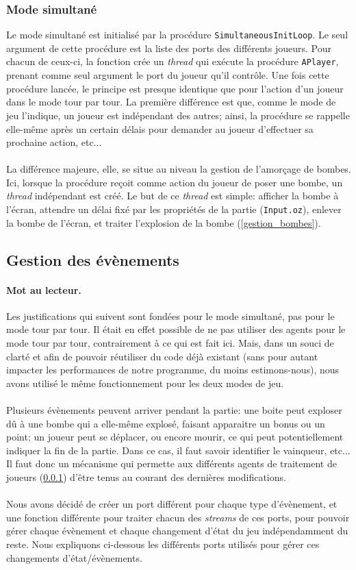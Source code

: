 \documentclass{article}
\begin{document}
\subsubsection{Mode simultané}
\label{simult}
Le mode simultané est initialisé par la procédure \texttt{SimultaneousInitLoop}. Le seul argument de cette procédure est la liste des ports des différents joueurs. Pour chacun de ceux-ci, la fonction crée un \emph{thread} qui exécute la procédure \texttt{APlayer}, prenant comme seul argument le port du joueur qu'il contrôle. Une fois cette procédure lancée, le principe est presque identique que pour l'action d'un joueur dans le mode tour par tour. La première différence est que, comme le mode de jeu l'indique, un joueur est indépendant des autres; ainsi, la procédure se rappelle elle-même après un certain délais pour demander au joueur d'effectuer sa prochaine action, etc... \\ \\
La différence majeure, elle, se situe au niveau la gestion de l'amorçage de bombes. Ici, lorsque la procédure reçoit comme action du joueur de poser une bombe, un \emph{thread} indépendant est créé. Le but de ce \emph{thread} est simple: afficher la bombe à l'écran, attendre un délai fixé par les propriétés de la partie (\texttt{Input.oz}), enlever la bombe de l'écran, et traiter l'explosion de la bombe (\ref{gestion_bombes}).

\subsection{Gestion des évènements}
\paragraph{Mot au lecteur.}Les justifications qui suivent sont fondées pour le mode simultané, pas pour le mode tour par tour. Il était en effet possible de ne pas utiliser des agents pour le mode tour par tour, contrairement à ce qui est fait ici. Mais, dans un souci de clarté et afin de pouvoir réutiliser du code déjà existant (sans pour autant impacter les performances de notre programme, du moins estimons-nous), nous avons utilisé le même fonctionnement pour les deux modes de jeu. \\ \\
Plusieurs évènements peuvent arriver pendant la partie: une boite peut exploser dû à une bombe qui a elle-même explosé, faisant apparaitre un bonus ou un point; un joueur peut se déplacer, ou encore mourir, ce qui peut potentiellement indiquer la fin de la partie. Dans ce cas, il faut savoir identifier le vainqueur, etc... Il faut donc un mécanisme qui permette aux différents agents de traitement de joueurs (\ref{simult}) d'être tenus au courant des dernières modifications. \\ \\
Nous avons décidé de créer un port différent pour chaque type d'évènement, et une fonction différente pour traiter chacun des \emph{streams} de ces ports, pour pouvoir gérer chaque évènement et chaque changement d'état du jeu indépendamment du reste. Nous expliquons ci-dessous les différents ports utilisés pour gérer ces changements d'état/évènements.
\end{document}
